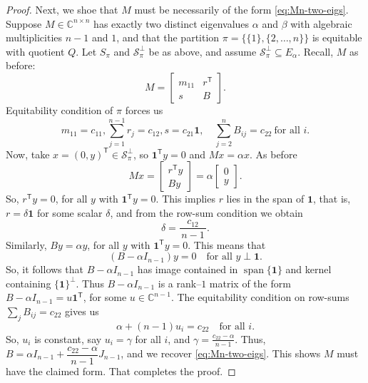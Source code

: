 \documentclass[10pt,a4paper]{amsart}
\begin{document}
\begin{proof}
	\medskip
	Next, we shoe that $M$ must be necessarily of the form \eqref{eq:Mn-two-eigs}. Suppose $M\in\mathbb{C}^{n\times n}$ has exactly two distinct eigenvalues $\alpha$ and $\beta$ with algebraic multiplicities $n-1$ and $1$, and that the partition $\pi=\{\{1\},\{2,\dots,n\}\}$ is equitable with quotient $Q$. Let $S_\pi$ and $\mathcal{S}_\pi^\perp$ be as above, and assume $\mathcal{S}_\pi^\perp \subseteq E_\alpha.$  Recall,   $M$ as before:
	$$
	M=\begin{bmatrix}m_{11} & r^\mathsf{T}\\ s & B\end{bmatrix}.
	$$
	Equitability condition of $\pi$  forces us
	$$
	m_{11}=c_{11},\sum_{j=1}^{n-1}r_j=c_{12},
	s=c_{21}\mathbf{1},\quad \sum_{j=2}^n B_{ij}=c_{22}\ \text{for all } i.
	$$
	Now, take $x=(0,y)^\mathsf{T}\in\mathcal{S}_\pi^\perp$, so $\mathbf{1}^\mathsf{T}y=0$ and $Mx=\alpha x$.
	As before
	$$
	Mx=\begin{bmatrix}r^\mathsf{T}y\\ By\end{bmatrix}=\alpha\begin{bmatrix}0\\y\end{bmatrix}.
	$$
	So, $r^\mathsf{T}y=0$, for all $y$ with $\mathbf{1}^\mathsf{T}y=0$. This implies $r$ lies in the span of $\mathbf{1}$, that is, $r=\delta\mathbf{1}$ for some scalar $\delta$, and from the row-sum condition we obtain
	$$
	\delta = \frac{c_{12}}{\,n-1\,}.
	$$
	Similarly, $By=\alpha y$, for all $y$ with $\mathbf{1}^\mathsf{T}y=0$. This means that
	$$
	(B-\alpha I_{n-1})y=0\quad\text{for all }y\perp \mathbf{1}.
	$$
	So, it follows that $B-\alpha I_{n-1}$ has image contained in $\operatorname{span}\{\mathbf{1}\}$ and kernel containing $\{\mathbf{1}\}^\perp$. Thus $B-\alpha I_{n-1}$ is a rank--$1$ matrix of the form
	$B-\alpha I_{n-1} = u\mathbf{1}^\mathsf{T}$,	for some $u\in\mathbb{C}^{n-1}$. The equitability condition on row-sums $\sum_{j}B_{ij}=c_{22}$ gives us
	$$
	\alpha + (n-1)u_i = c_{22}\quad\text{for all }i.
	$$
	So, $u_i$ is constant, say $u_i=\gamma$ for all $i$, and $\gamma = \frac{c_{22}-\alpha}{\,n-1\,}.$	Thus, $B = \alpha I_{n-1} + \dfrac{c_{22}-\alpha}{\,n-1\,}J_{n-1}$, and we recover \eqref{eq:Mn-two-eigs}. This shows $M$ must have the claimed form.  That completes the proof.
\end{proof}
\end{document}
